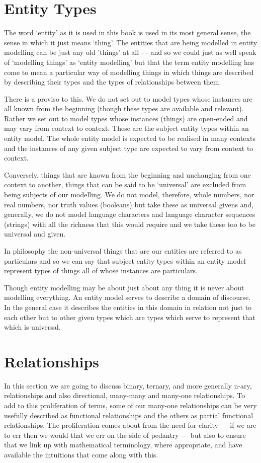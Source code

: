 
\section{Entity Types}

\mynote The word `entity' as it is used in this book is used in its most general sense,  the sense in which it just means `thing'. The entities that are being modelled in entity modelling can be just any old 'things' at all --- and so we could just as well speak of `modelling things' as `entity modelling' but that the term entity modelling
has come to mean a particular way of modelling things in which things are described by describing their types and the types of relationships between them.

\mynote There is a proviso to this. We do not set out to model types whose instances are all known from the beginning (though these types are available and relevant). Rather we set out to model types whose instances (things) are open-ended and may vary from context to context. These are the subject entity types within an entity model. The whole entity model is expected to be realised in many contexts and the instances of any given subject type are expected to vary from context to context.
 
\mynote
Conversely, things that are known from the beginning and unchanging from one context to another, things that can be said to be `universal' are excluded from being subjects of our modelling. We do not model, therefore, whole numbers, nor real numbers, nor truth values (booleans) but take these as universal givens and, generally, we do not model language characters and language character sequences (strings) with all the richness that this would require and we take these too to be universal and given. 

\mynote
In philosophy the non-universal things that are our entities are referred to as particulars and so we can say that subject entity types within an entity model represent types of things all of whose instances are particulars. 

\mynote Though entity modelling may be about just about any thing it is never about modelling everything.
An entity model serves to describe a domain of discourse. In the general case it describes the entities in this domain in relation not just to each other but to other given types which are types which serve to represent that which is universal. 

\section{Relationships}
\mynote
In this section we are going to discuss binary, ternary, and more generally n-ary, relationships and also  directional, many-many and many-one relationships. To add to this proliferation of terms, some of our many-one relationships can be very usefully described as functional relationships and the others as partial functional relationships. 	The proliferation comes about from the need for clarity --- if we are to err then we would that we err on the side of pedantry --- but also to ensure that we link up with mathematical terminology, where appropriate, and have available the intuitions that come along with this.

